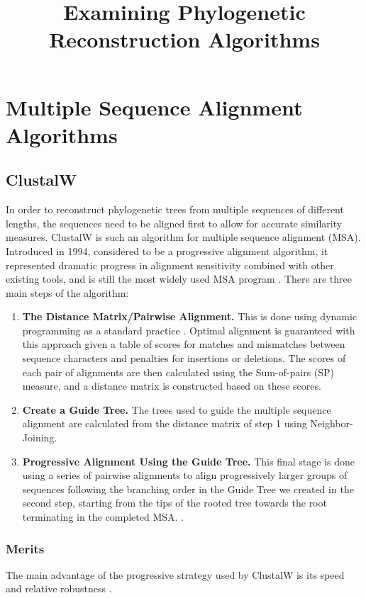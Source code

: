 \documentclass[10pt,twocolumn]{article}
\begin{document}
\title{Examining Phylogenetic Reconstruction Algorithms}

\author{}

\maketitle
\thispagestyle{empty}

\section*{Multiple Sequence Alignment Algorithms}
\subsection*{ClustalW}
In order to reconstruct phylogenetic trees from multiple sequences of different lengths, the sequences need to be aligned first to allow for accurate similarity measures. ClustalW is such an algorithm for multiple sequence alignment (MSA). Introduced in 1994, considered to be a progressive alignment algorithm, it represented dramatic progress in alignment sensitivity combined with other existing tools, and is still the most widely used MSA program \cite{edgar2006multiple}. There are three main steps of the algorithm:
\begin{enumerate}
  \item \textbf{The Distance Matrix/Pairwise Alignment.} This is done using dynamic programming as a standard practice \cite{thompson1994clustal}. Optimal alignment is guaranteed with this approach given a table of scores for matches and mismatches  between sequence characters and penalties for insertions or deletions. The scores of each pair of alignments are then calculated using the Sum-of-pairs (SP) measure, and a distance matrix is constructed based on these scores.
  \item \textbf{Create a Guide Tree.} The trees used to guide the multiple sequence alignment are calculated from the distance matrix of step 1 using Neighbor-Joining. 
  \item \textbf{Progressive Alignment Using the Guide Tree.} This final stage is done using a series of pairwise alignments to align progressively larger groups of sequences following the branching order in the Guide Tree we created in the second step, starting from the tips of the rooted tree towards the root terminating in the completed MSA. \cite{thompson1994clustal}.
\end{enumerate}
\subsubsection*{Merits}
The main advantage of the progressive strategy used by ClustalW is its speed and relative robustness \cite{notredame2000t}. \\
\end{document}
